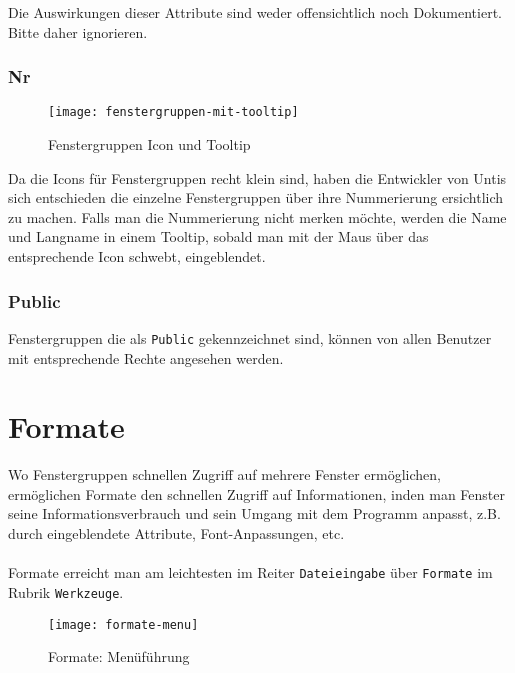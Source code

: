 Die Auswirkungen dieser Attribute sind weder offensichtlich noch Dokumentiert. Bitte daher ignorieren.

\subsubsection{Nr}

\begin{wrapfigure}{r}{.4\textwidth}
	\vspace{-14pt}
	\texttt{[image: fenstergruppen-mit-tooltip]}
	\vspace{-5pt}
	\caption{Fenstergruppen Icon und Tooltip}
	\label{fig:fenstergruppen-mit-tooltip}
	\vspace{-24pt}
\end{wrapfigure}

Da die Icons für Fenstergruppen recht klein sind, haben die Entwickler von Untis sich entschieden die einzelne Fenstergruppen über ihre Nummerierung ersichtlich zu machen. Falls man die Nummerierung nicht merken möchte, werden die Name und Langname in einem Tooltip, sobald man mit der Maus über das entsprechende Icon schwebt, eingeblendet.

\subsubsection{Public}

Fenstergruppen die als \texttt{Public} gekennzeichnet sind, können von allen Benutzer mit entsprechende Rechte angesehen werden.

\section{Formate}
\label{sec:formate}

Wo Fenstergruppen schnellen Zugriff auf mehrere Fenster ermöglichen, ermöglichen Formate den schnellen Zugriff auf Informationen, inden man Fenster seine Informationsverbrauch und sein Umgang mit dem Programm anpasst, z.B. durch eingeblendete Attribute, Font-Anpassungen, etc.\\
\\
Formate erreicht man am leichtesten im Reiter \texttt{Dateieingabe} über \texttt{Formate} im Rubrik \texttt{Werkzeuge}.

\begin{figure}[h]
	\texttt{[image: formate-menu]}
	\vspace{-15pt}
	\caption{Formate: Menüführung}
	\label{fig:formate-menu}
\end{figure}

